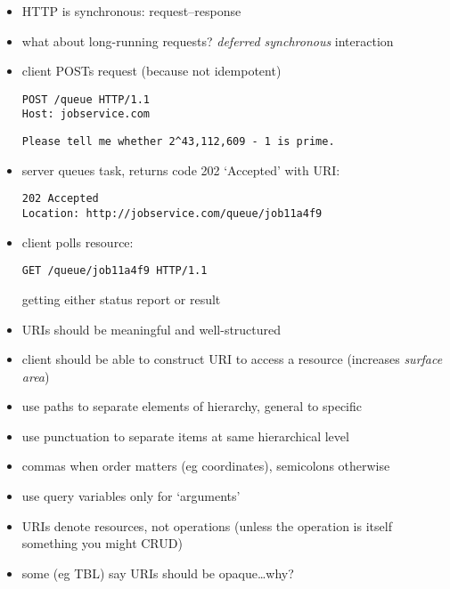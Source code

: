 \documentclass{sepslide-soa-faked} %
\begin{document}
\begin{slide}
\begin{itemize}
\item HTTP is synchronous: request--response
\item what about long-running requests? \emph{deferred synchronous} interaction
\medskip
\item client POSTs request (because not idempotent)
\begin{verbatim}
POST /queue HTTP/1.1
Host: jobservice.com
\end{verbatim}
\begin{verbatim}
Please tell me whether 2^43,112,609 - 1 is prime.
\end{verbatim}
\item server queues task, returns code 202 `Accepted' with URI:
\begin{verbatim}
202 Accepted
Location: http://jobservice.com/queue/job11a4f9
\end{verbatim}
\item client polls resource:
\begin{verbatim}
GET /queue/job11a4f9 HTTP/1.1
\end{verbatim}
getting either status report or result
\end{itemize}
\end{slide}

\begin{slide}
\begin{itemize}
\item URIs should be meaningful and well-structured
\item client should be able to construct URI to access a resource
  (increases \emph{surface area})
\item use paths to separate elements of hierarchy, general to specific
\item use punctuation to separate items at same hierarchical level
\item commas when order matters (eg coordinates), semicolons otherwise
\item use query variables only for `arguments'
\item URIs denote resources, not operations
  (unless the operation is itself something you might CRUD)
\item some (eg TBL) say URIs should be opaque\ldots why?
\end{itemize}
\end{slide}
\end{document}
